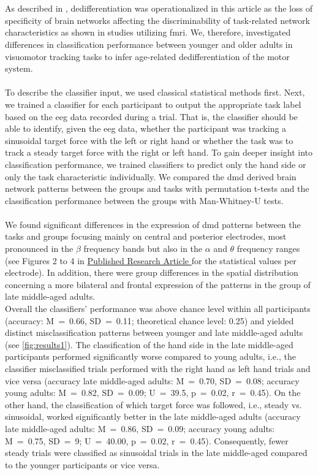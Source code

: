 \hyperref[pub:paperI]{}\\
\\
As described in , dedifferentiation was operationalized in this article as the loss of specificity of brain networks affecting the discriminability of task-related network characteristics as shown in studies utilizing \gls{fmri}. We, therefore, investigated differences in classification performance between younger and older adults in visuomotor tracking tasks to infer age-related dedifferentiation of the motor system.\\
\\
To describe the classifier input, we used classical statistical methods first. Next, we trained a classifier for each participant to output the appropriate task label based on the \gls{eeg} data recorded during a trial. That is, the classifier should be able to identify, given the \gls{eeg} data, whether the participant was tracking a sinusoidal target force with the left or right hand or whether the task was to track a steady target force with the right or left hand. To gain deeper insight into classification performance, we trained classifiers to predict only the hand side or only the task characteristic individually. We compared the \gls{dmd} derived brain network patterns between the groups and tasks with permutation t-tests and the classification performance between the groups with Man-Whitney-U tests.\\
\\
We found significant differences in the expression of \gls{dmd} patterns between the tasks and groups focusing mainly on central and posterior electrodes, most pronounced in the $\beta$ frequency bands but also in the $\alpha$ and $\theta$ frequency ranges (see Figures 2 to 4 in \hyperref[pub:paperI]{Published Research Article } for the statistical values per electrode). In addition, there were group differences in the spatial distribution concerning a more bilateral and frontal expression of the patterns in the group of late middle-aged adults.\\
Overall the classifiers' performance was above chance level within all participants (accuracy: M~=~0.66, SD~=~0.11; theoretical chance level: 0.25) and yielded distinct misclassification patterns between younger and late middle-aged adults (see \autoref{fig:results1}). The classification of the hand side in the late middle-aged participants performed significantly worse compared to young adults, i.e., the classifier misclassified trials performed with the right hand as left hand trials and vice versa (accuracy late middle-aged adults: M~=~0.70, SD~=~0.08; accuracy young adults: M~=~0.82, SD~=~0.09; U~=~39.5, p~=~0.02, r~=~0.45). On the other hand, the classification of which target force was followed, i.e., steady vs. sinusoidal, worked significantly better in the late middle-aged adults (accuracy late middle-aged adults: M~=~0.86, SD~=~0.09; accuracy young adults: M~=~0.75, SD~=~9; U~=~40.00, p~=~0.02, r~=~0.45). Consequently, fewer steady trials were classified as sinusoidal trials in the late middle-aged compared to the younger participants or vice versa.

